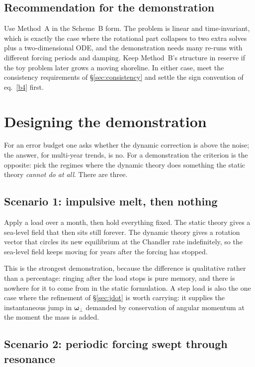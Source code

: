 \documentclass[11pt,a4paper]{article}
\newcommand{\bw}{\bm{\omega}}
\begin{document}
\subsection{Recommendation for the demonstration}

Use Method~A in the Scheme~B form. The problem is linear and time-invariant, which is exactly the
case where the rotational part collapses to two extra solves plus a two-dimensional ODE, and the
demonstration needs many re-runs with different forcing periods and damping. Keep Method~B's
structure in reserve if the toy problem later grows a moving shoreline. In either case, meet the
consistency requirements of \S\ref{sec:consistency} and settle the sign convention of
eq.~\eqref{b4} first.

\section{Designing the demonstration}
\label{sec:demo}

For an error budget one asks whether the dynamic correction is above the noise; the answer, for
multi-year trends, is no. For a demonstration the criterion is the opposite: pick the regimes where
the dynamic theory does something the static theory \emph{cannot do at all}. There are three.

\subsection{Scenario 1: impulsive melt, then nothing}

Apply a load over a month, then hold everything fixed. The static theory gives a sea-level field
that then sits still forever. The dynamic theory gives a rotation vector that circles its new
equilibrium at the Chandler rate indefinitely, so the sea-level field keeps moving for years after
the forcing has stopped.

This is the strongest demonstration, because the difference is qualitative rather than a
percentage: ringing after the load stops is pure memory, and there is nowhere for it to come from in
the static formulation. A step load is also the one case where the refinement of \S\ref{sec:jdot} is
worth carrying: it supplies the instantaneous jump in $\bw_\perp$ demanded by conservation of angular
momentum at the moment the mass is added.

\subsection{Scenario 2: periodic forcing swept through resonance}
\end{document}
